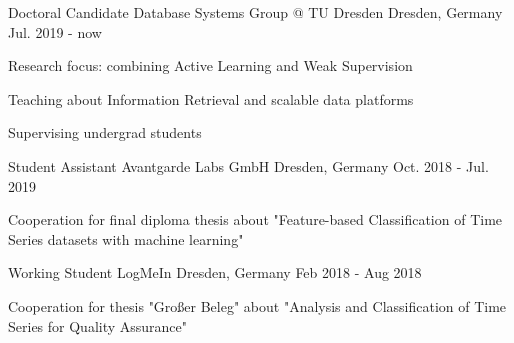 \begin{cventries}



	\cventry
	{Doctoral Candidate}
	{Database Systems Group @ TU Dresden}
	{Dresden, Germany}
	{Jul. 2019 - now}
	{
		\begin{cvitems}
			\item{Research focus: combining Active Learning and Weak Supervision}
			\item{Teaching about Information Retrieval and scalable data platforms}
			\item{Supervising undergrad students}
		\end{cvitems}
	}


	\cventry
	{Student Assistant}
	{Avantgarde Labs GmbH}
	{Dresden, Germany}
	{Oct. 2018 - Jul. 2019}
	{
		\begin{cvitems}
			\item{Cooperation for final diploma thesis about "Feature-based Classification of Time Series datasets with machine learning"}
		\end{cvitems}
	}
	\cventry
	{Working Student} %
	{LogMeIn} %
	{Dresden, Germany} %
	{Feb 2018 - Aug 2018} %
	{
		\begin{cvitems} %
			\item {Cooperation for thesis "Großer Beleg" about "Analysis and Classification of Time Series for Quality Assurance"}
		\end{cvitems}
	}


\end{cventries}
